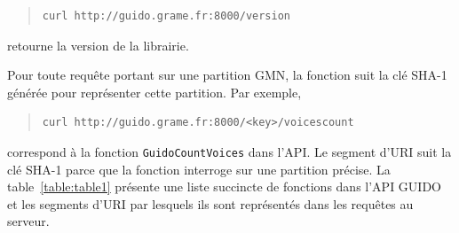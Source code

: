 \documentclass{article}
\newcommand{\guidosize}{7pt}
\begin{document}
\begin{quote}
\begingroup
\fontsize{\guidosize}{12pt}\selectfont
\begin{verbatim}
curl http://guido.grame.fr:8000/version
\end{verbatim}
\endgroup
\end{quote}
retourne la version de la librairie.\par
Pour toute requête portant sur une partition GMN, la fonction suit la clé SHA-1 générée pour représenter cette partition. Par exemple,
\begin{quote}
\begingroup
\fontsize{\guidosize}{12pt}\selectfont
\begin{verbatim}
curl http://guido.grame.fr:8000/<key>/voicescount
\end{verbatim}
\endgroup
\end{quote}
correspond à la fonction \verb=GuidoCountVoices= dans l'API. Le segment d'URI suit la clé SHA-1 parce que la fonction interroge sur une partition précise.
La table~\ref{table:table1} présente une liste succincte de fonctions dans l'API GUIDO et les segments d'URI par lesquels ils sont représentés dans les requêtes au serveur.
\end{document}
